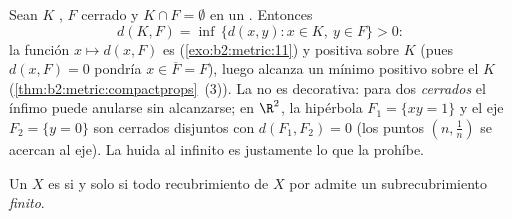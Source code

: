\begin{example}\label{ex:b2:metric:setdistance}
Sean $K$ , $F$ cerrado y $K \cap F = \emptyset$ en un
. Entonces
\[
d(K, F) = \inf\,\{d(x, y) : x \in K,\ y \in F\} > 0 :
\]
la función $x \mapsto d(x, F)$ es 
(\cref{exo:b2:metric:11}) y positiva sobre $K$ (pues $d(x, F) = 0$
pondría $x \in \overline F = F$), luego alcanza un mínimo positivo
sobre el  $K$
(\cref{thm:b2:metric:compactprops}~(3)). La  no es
decorativa: para dos \emph{cerrados} el ínfimo puede anularse sin
alcanzarse; en $\R^2$, la hipérbola $F_1 = \{xy = 1\}$ y el eje
$F_2 = \{y = 0\}$ son cerrados disjuntos con $d(F_1, F_2) = 0$
(los puntos $(n, \frac1n)$ se acercan al eje). La huida al
infinito es justamente lo que la  prohíbe.
\end{example}

\begin{theorem}\label{thm:b2:metric:borellebesgue}
Un  $X$ es  si y solo si todo recubrimiento
de $X$ por  admite un subrecubrimiento
\emph{finito}.
\end{theorem}

